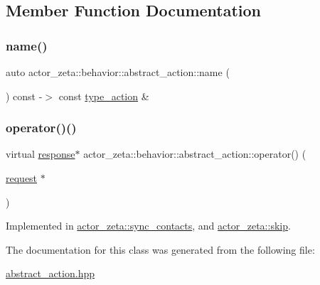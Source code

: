 \subsection{Member Function Documentation}
\mbox{\label{classactor__zeta_1_1behavior_1_1abstract__action_aa01dde89f5f3bc0a5b31e73eb5b38737}} 
\subsubsection{\texorpdfstring{name()}{name()}}
{\footnotesize\ttfamily auto actor\+\_\+zeta\+::behavior\+::abstract\+\_\+action\+::name (\begin{DoxyParamCaption}{ }\end{DoxyParamCaption}) const -\/$>$ const \hyperlink{classactor__zeta_1_1behavior_1_1type__action}{type\+\_\+action} \& \hspace{0.3cm}{\ttfamily [inline]}}

\mbox{\label{classactor__zeta_1_1behavior_1_1abstract__action_a5e48075d77fbd93615fc9b757e6a4d87}} 
\subsubsection{\texorpdfstring{operator()()}{operator()()}}
{\footnotesize\ttfamily virtual \hyperlink{classactor__zeta_1_1behavior_1_1response}{response}$\ast$ actor\+\_\+zeta\+::behavior\+::abstract\+\_\+action\+::operator() (\begin{DoxyParamCaption}\item[{\hyperlink{classactor__zeta_1_1behavior_1_1request}{request} $\ast$}]{ }\end{DoxyParamCaption})\hspace{0.3cm}{\ttfamily [pure virtual]}}



Implemented in \hyperlink{classactor__zeta_1_1sync__contacts_ab135afb3284f42dc36d54ea73a8b5ac8}{actor\+\_\+zeta\+::sync\+\_\+contacts}, and \hyperlink{classactor__zeta_1_1skip_a0a674c6ce55d365b2bae8ec19a58e29f}{actor\+\_\+zeta\+::skip}.



The documentation for this class was generated from the following file\+:\begin{DoxyCompactItemize}
\item 
\hyperlink{abstract__action_8hpp}{abstract\+\_\+action.\+hpp}\end{DoxyCompactItemize}

